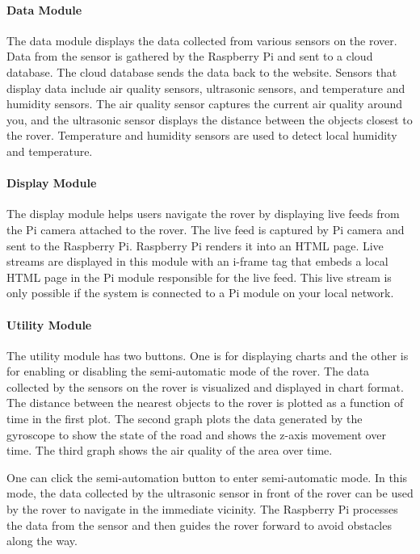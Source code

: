 \documentclass[conference,a4paper]{IEEEtran}
\begin{document}
\paragraph{Data Module}
The data module displays the data collected from  various sensors on the rover. Data from the sensor is gathered by the Raspberry Pi and sent to a cloud database. The cloud database  sends the data back to the website. Sensors that display data include air quality sensors, ultrasonic sensors, and temperature and humidity sensors. The air quality sensor captures the current air quality around you, and the ultrasonic sensor displays the distance between the  objects closest to the rover. Temperature and humidity sensors are used to detect local humidity and temperature.
\paragraph{Display Module}
The display module helps users navigate the rover  by displaying live feeds from the Pi camera attached to the rover. The live feed is captured by Pi camera and  sent to the Raspberry Pi. Raspberry Pi renders it into an HTML page. Live streams are displayed in this module with an i-frame tag that embeds a local HTML page in the Pi module responsible for the live feed. This live stream is only  possible if the system is connected to a Pi module on your local network.
\paragraph{Utility Module}
The utility module has two buttons. One is for displaying charts and the other is for enabling or disabling the semi-automatic mode of the rover. The data collected by the 
sensors on the rover is visualized and displayed in chart format. The distance between the nearest objects to the rover is plotted as a function of time in the first plot. The second graph plots the data generated by the gyroscope to show the state of the road and shows the z-axis movement over time. The third graph shows the air quality of the area over time. 

One can click the semi-automation button to enter semi-automatic mode. In this mode, the data collected by the ultrasonic sensor in front of the rover can be used by the rover to navigate in the immediate vicinity. The Raspberry Pi processes the data from the sensor and then guides the rover forward to avoid obstacles along the way.
\end{document}
